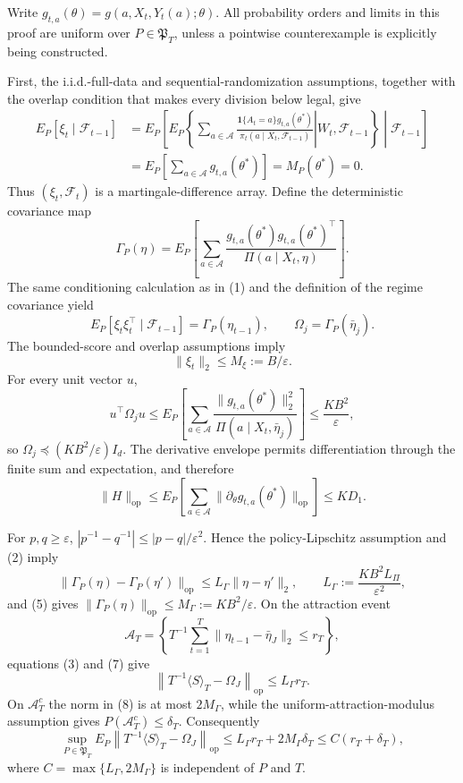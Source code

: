 Write \(g_{t,a}(\theta)=g(a,X_t,Y_t(a);\theta)\). All probability orders and limits in this proof are uniform over \(P\in\mathfrak P_T\), unless a pointwise counterexample is explicitly being constructed.

First, the i.i.d.-full-data and sequential-randomization assumptions, together with the overlap condition that makes every division below legal, give
\[
\begin{aligned}
 E_P[\xi_t\mid\mathcal F_{t-1}]
 &=E_P\!\left[E_P\!\left\{\left.
 \sum_{a\in\mathcal A}\frac{\mathbf 1\{A_t=a\}g_{t,a}(\theta^*)}
 {\pi_t(a\mid X_t,\mathcal F_{t-1})}
 \right|W_t,\mathcal F_{t-1}\right\}\middle|\mathcal F_{t-1}\right]\\
 &=E_P\!\left[\sum_{a\in\mathcal A}g_{t,a}(\theta^*)\right]
 =M_P(\theta^*)=0.
\end{aligned} \tag{1}
\]
Thus \((\xi_t,\mathcal F_t)\) is a martingale-difference array. Define the deterministic covariance map
\[
 \Gamma_P(\eta)=E_P\!\left[
 \sum_{a\in\mathcal A}
 \frac{g_{t,a}(\theta^*)g_{t,a}(\theta^*)^\top}
 {\Pi(a\mid X_t,\eta)}\right]. \tag{2}
\]
The same conditioning calculation as in (1) and the definition of the regime covariance yield
\[
 E_P[\xi_t\xi_t^\top\mid\mathcal F_{t-1}]=\Gamma_P(\eta_{t-1}),
 \qquad \Omega_j=\Gamma_P(\bar\eta_j). \tag{3}
\]
The bounded-score and overlap assumptions imply
\[
 \|\xi_t\|_2\le M_\xi:=B/\varepsilon. \tag{4}
\]
For every unit vector \(u\),
\[
 u^\top\Omega_ju
 \le E_P\!\left[\sum_{a\in\mathcal A}
 \frac{\|g_{t,a}(\theta^*)\|_2^2}
 {\Pi(a\mid X_t,\bar\eta_j)}\right]
 \le \frac{KB^2}{\varepsilon}, \tag{5}
\]
so \(\Omega_j\preceq(KB^2/\varepsilon)I_d\). The derivative envelope permits differentiation through the finite sum and expectation, and therefore
\[
 \|H\|_{\mathrm{op}}
 \le E_P\!\left[\sum_{a\in\mathcal A}
 \|\partial_\theta g_{t,a}(\theta^*)\|_{\mathrm{op}}\right]
 \le KD_1. \tag{6}
\]

For \(p,q\ge\varepsilon\), \(|p^{-1}-q^{-1}|\le |p-q|/\varepsilon^2\). Hence the policy-Lipschitz assumption and (2) imply
\[
 \|\Gamma_P(\eta)-\Gamma_P(\eta')\|_{\mathrm{op}}
 \le L_\Gamma\|\eta-\eta'\|_2,
 \qquad L_\Gamma:=\frac{KB^2L_\Pi}{\varepsilon^2}, \tag{7}
\]
and (5) gives \(\|\Gamma_P(\eta)\|_{\mathrm{op}}\le M_\Gamma:=KB^2/\varepsilon\). On the attraction event
\[
 \mathcal A_T=\left\{T^{-1}\sum_{t=1}^T
 \|\eta_{t-1}-\bar\eta_J\|_2\le r_T\right\},
\]
equations (3) and (7) give
\[
 \left\|T^{-1}\langle S\rangle_T-\Omega_J\right\|_{\mathrm{op}}
 \le L_\Gamma r_T. \tag{8}
\]
On \(\mathcal A_T^c\) the norm in (8) is at most \(2M_\Gamma\), while the uniform-attraction-modulus assumption gives \(P(\mathcal A_T^c)\le\delta_T\). Consequently
\[
 \sup_{P\in\mathfrak P_T}E_P\left\|T^{-1}\langle S\rangle_T-\Omega_J\right\|_{\mathrm{op}}
 \le L_\Gamma r_T+2M_\Gamma\delta_T
 \le C(r_T+\delta_T), \tag{9}
\]
where \(C=\max\{L_\Gamma,2M_\Gamma\}\) is independent of \(P\) and \(T\).

